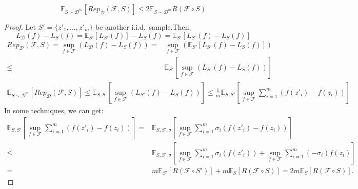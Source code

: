 \begin{lemma}
    \begin{equation}
        \mathbb{E} _{S \sim \mathcal{D}^m}[Rep_ \mathcal{D}( \mathcal{F}, S ) ]
        \le 2 \mathbb{E}_{S \sim \mathcal{D}^m } R( \mathcal{F}\circ S)
    \end{equation}
    \begin{proof}
        Let $ S' = \{ z'_1, \ldots, z'_m \} $ be another i.i.d.\ sample.Then,
        \[
            L_ \mathcal{D}(f) - L_S(f) = \mathbb{E}_{S'} [L_{S'}(f)] - L_S(f)= \mathbb{E}_{S'} [L_{S'}(f) - L_S(f)]
        \]
        \begin{align*}
            Rep_{\mathcal{D}}( \mathcal{F}, S) = \sup_{f\in \mathcal{F}}(L_ \mathcal{D}(f) - L_S(f))
            =& \sup_{f \in \mathcal{F}} (\mathbb{E}_{S'} [L_{S'}(f) - L_S(f)]) \\
            \le& \mathbb{E}_{S'} \left[ \sup_{f\in\mathcal{F}} (L_{S'}(f) - L_S(f))\right]
        \end{align*}
        \begin{align*}
            \mathbb{E}_{S\sim \mathcal{D}^m} [Rep_{\mathcal{D}}(\mathcal{F}, S)]
            \le \mathbb{E}_{S,S'} \left[ \sup_{f\in\mathcal{F}} (L_{S'}(f) - L_S(f))\right]
            \le \frac{1}{m} \mathbb{E}_{S,S'} \left[ \sup_{f\in\mathcal{F}} \sum^{m}_{i=1} (f(z'_i) - f(z_i))\right]
        \end{align*}
        In some techniques, we can get:
        \begin{align*}
            \mathbb{E}_{S,S'} \left[ \sup_{f\in\mathcal{F}} \sum^{m}_{i=1} (f(z'_i) - f(z_i))\right]
            =& \mathbb{E}_{S,S',\sigma} \left[ \sup_{f\in\mathcal{F}} \sum^{m}_{i=1} \sigma_i (f(z'_i) - f(z_i))\right]\\
            \le& \mathbb{E}_{S,S',\sigma} \left[ \sup_{f\in\mathcal{F}} \sum^{m}_{i=1} \sigma_i (f(z'_i)) + \sup_{f\in\mathcal{F}} \sum^{m}_{i=1} (-\sigma_i) f(z_i)\right]\\
            =& m \mathbb{E}_{S'}[R( \mathcal{F} \circ S')] + m \mathbb{E}_{S}[R( \mathcal{F} \circ S)]
            = 2m \mathbb{E}_{S} [R( \mathcal{F} \circ S)].
        \end{align*}
    \end{proof}
\end{lemma}

